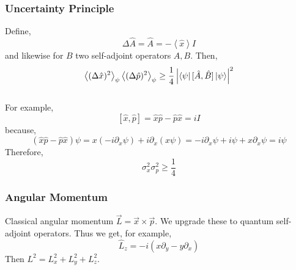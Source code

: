 \documentclass[12]{article}
\begin{document}
\subsubsection{Uncertainty Principle}
Define,
\[ \Delta \hat{A} = \hat{A} = - \left< \hat{x} \right> I \]
and likewise for $B$ two self-adjoint operators $A, B$. Then,
\[ \left< (\Delta \hat{x})^2 \right>_\psi \left< (\Delta \hat{p})^2 \right>_\psi \ge \frac{1}{4} \left| \left< \psi \right| [\hat{A}, \hat{B}] \left| \psi \right> \right|^2 \]
\bigskip\\
For example,
\[ [\hat{x}, \hat{p}] = \hat{x} \hat{p} - \hat{p} \hat{x} = i I \]
because,
\[ (\hat{x} \hat{p} - \hat{p} \hat{x}) \psi = x (-i \partial_x \psi) + i \partial_x (x \psi) = - i \partial_x \psi + i \psi + x \partial_x \psi = i \psi \]
Therefore,
\[ \sigma_x^2 \sigma_p^2 \ge \frac{1}{4} \]

\subsubsection{Angular Momentum}

Classical angular momentum $\vec{L} = \vec{x} \times \vec{p}$. We upgrade these to quantum self-adjoint operators. Thus we get, for example,
\[ \hat{L}_z = - i (x \partial_y - y \partial_x) \]
Then $L^2 = L_x^2 + L_y^2 + L_z^2$.  
\end{document}
